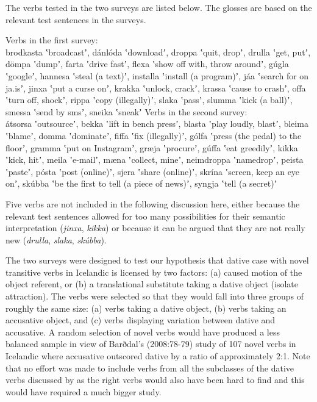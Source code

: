 \documentclass[output=paper,modfonts,nonflat,colorlinks,citecolor=brown]{langsci/langscibook}
\begin{document}
The verbs tested in the two surveys are listed below. The glosses are based on the relevant test sentences in the surveys. 


\ea
\ea Verbs in the first survey: \\
brodkasta ʽbroadcastʼ, dánlóda ʽdownloadʼ, droppa ʽquit, dropʼ, drulla ʽget, putʼ, dömpa ʽdumpʼ, farta ʽdrive fastʼ, flexa ʽshow off with, throw aroundʼ, gúgla ʽgoogleʼ, hannesa ʽsteal (a text)ʼ, installa ʽinstall (a program)ʼ, jáa ʽsearch for on ja.isʼ, jinxa ʽput a curse onʼ, krakka ʽunlock, crackʼ, krassa ʽcause to crashʼ, offa ʽturn off, shockʼ, rippa ʽcopy (illegally)ʼ, slaka ʽpassʼ, slumma ʽkick (a ball)ʼ, smessa ʽsend by smsʼ, sneika ʽsneakʼ
\ex Verbs in the second survey: \\
átsorsa ʽoutsourceʼ, bekka ʽlift in bench pressʼ, blasta ʽplay loudly, blastʼ, bleima ʽblameʼ, domma ʽdominateʼ, fiffa ʽfix (illegally)ʼ, gólfa ʽpress (the pedal) to the floorʼ, gramma ʽput on Instagramʼ, græja ʽprocureʼ, gúffa ʽeat greedilyʼ, kikka ʽkick, hitʼ, meila ʽe-mailʼ, mæna ʽcollect, mineʼ, neimdroppa ʽnamedropʼ, peista ʽpasteʼ, pósta ʽpost (online)ʼ, sjera ʽshare (online)ʼ, skrína ʽscreen, keep an eye onʼ, skúbba ʽbe the first to tell (a piece of news)ʼ, syngja ʽtell (a secret)ʼ\\
\z
\z

Five verbs are not included in the following discussion here, either because the relevant test sentences allowed for too many possibilities for their semantic interpretation (\textit{jinxa}, \textit{kikka}) or because it can be argued that they are not really new  (\textit{drulla}, \textit{slaka}, \textit{skúbba}). 


The two surveys were designed to test our hypothesis that dative case with novel transitive verbs in Icelandic is licensed by two factors: (a) caused motion of the object referent, or (b) a translational substitute taking a dative object (isolate attraction). The verbs were selected so that they would fall into three groups of roughly the same size: (a) verbs taking a dative object, (b) verbs taking an accusative object, and (c) verbs displaying variation between dative and accusative. A random selection of novel verbs would have produced a less balanced sample in view of Barðdal’s (2008:78-79) study of 107 novel verbs in Icelandic where accusative outscored dative by a ratio of approximately 2:1. Note that no effort was made to include verbs from all the subclasses of the dative verbs discussed by \citet{Maling2002} as the right verbs would also have been hard to find and this would have required a much bigger study.
\end{document}
